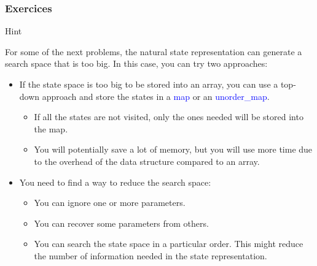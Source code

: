 \documentclass{beamer}
\newcommand{\uvalink}[2]{UVa Online Judge (http://uva.onlinejudge.org)
  problem number \href{#2}{\textcolor{blue}{#1}.}}
\newcommand{\hint}[1]{
\begin{bclogo}[arrondi=0.1, logo=\bclampe]{Hint}
#1
\end{bclogo}
}
\newcounter{exo}
\newcommand{\exo}{
  \addtocounter{exo}{1}
  Exercice \arabic{exo}
}
\begin{document}
\begin{frame}%
\frametitle{Exercices}

\scriptsize

\hint{
For some of the next problems, the natural state representation can generate a search space that is too big.
In this case, you can try two approaches:
\begin{itemize}

\item If the state space is too big to be stored into an array, you can use a top-down approach and store the states in a \textcolor{blue}{map} or an
\textcolor{blue}{unorder\_map}.
\vspace{0.1cm}
\begin{itemize}
\scriptsize
\item<2-> If all the states are not visited, only the ones needed will be stored into the map.
\vspace{0.1cm}
\item<2-> You will potentially save a lot of memory, but you will use more time
due to the overhead of the data structure compared to an array.
\end{itemize}

\item<3-> You need to find a way to reduce the search space:
\begin{itemize}
\scriptsize
\item<3-> You can ignore one or more parameters.
\vspace{0.1cm}
\item<4-> You can recover some parameters from others.
\vspace{0.1cm}
\item<5-> You can search the state space in a particular order. This might reduce the number of information
needed in the state representation.
\vspace{0.1cm}

\end{itemize}

\end{itemize}
}

\end{frame}

\end{document}
